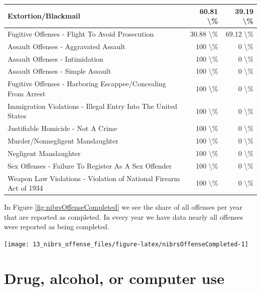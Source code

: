 \documentclass[
]{krantz}
\let\origfigure\figure
\let\endorigfigure\endfigure
\renewenvironment{figure}[1][2] {
    \expandafter\origfigure\expandafter[H]
} {
    \endorigfigure
}
\begin{document}
\begin{longtable}[t]{l|r|r}
\hline
Extortion/Blackmail & 60.81 \textbackslash{}\% & 39.19 \textbackslash{}\%\\
\hline
Fugitive Offenses - Flight To Avoid Prosecution & 30.88 \textbackslash{}\% & 69.12 \textbackslash{}\%\\
\hline
Assault Offenses - Aggravated Assault & 100 \textbackslash{}\% & 0 \textbackslash{}\%\\
\hline
Assault Offenses - Intimidation & 100 \textbackslash{}\% & 0 \textbackslash{}\%\\
\hline
Assault Offenses - Simple Assault & 100 \textbackslash{}\% & 0 \textbackslash{}\%\\
\hline
Fugitive Offenses - Harboring Escappee/Concealing From Arrest & 100 \textbackslash{}\% & 0 \textbackslash{}\%\\
\hline
Immigration Violations - Illegal Entry Into The United States & 100 \textbackslash{}\% & 0 \textbackslash{}\%\\
\hline
Justifiable Homicide - Not A Crime & 100 \textbackslash{}\% & 0 \textbackslash{}\%\\
\hline
Murder/Nonnegligent Manslaughter & 100 \textbackslash{}\% & 0 \textbackslash{}\%\\
\hline
Negligent Manslaughter & 100 \textbackslash{}\% & 0 \textbackslash{}\%\\
\hline
Sex Offenses - Failure To Register As A Sex Offender & 100 \textbackslash{}\% & 0 \textbackslash{}\%\\
\hline
Weapon Law Violations - Violation of National Firearm Act of 1934 & 100 \textbackslash{}\% & 0 \textbackslash{}\%\\
\hline
\end{longtable}

In Figure \ref{fig:nibrsOffenseCompleted} we see the share
of all offenses per year that are reported as completed. In
every year we have data nearly all offenses were reported as
being completed.

\begin{figure}

{\centering \texttt{[image: 13\_nibrs\_offense\_files/figure-latex/nibrsOffenseCompleted-1]} 

}

\caption{The annual percent of offenses reported as completed, 1991-2022.}\label{fig:nibrsOffenseCompleted}
\end{figure}

\section{Drug, alcohol, or computer
use}\label{drug-alcohol-or-computer-use}
\end{document}
